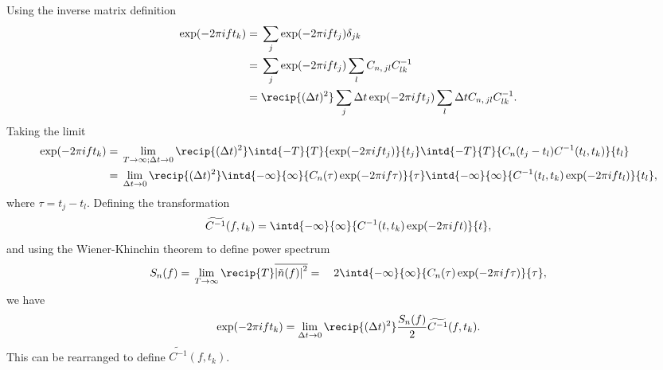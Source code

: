 Using the inverse matrix definition
\begin{align}
\exp(-2\pi i f t_k) = {} & \sum_j \exp(-2\pi ift_j) \delta_{jk} \nonumber \\
 = {} & \sum_j \exp(-2\pi ift_j) \sum_l C_{n,\,jl}C^{-1}_{lk} \nonumber \\
 = {} & \recip{(\Delta t)^2} \sum_j \Delta t \exp(-2\pi ift_j) \sum_l \Delta t C_{n,\,jl}C^{-1}_{lk}.
\end{align}
Taking the limit
\begin{align}
\exp(-2\pi i f t_k) = {} & \lim_{T \rightarrow \infty; \Delta t \rightarrow 0} \recip{(\Delta t)^2} \intd{-T}{T}{\exp(-2\pi ift_j)}{t_j} \intd{-T}{T}{C_n(t_j-t_l)C^{-1}(t_l,t_k)}{t_l} \nonumber \\
 = {} & \lim_{\Delta t \rightarrow 0} \recip{(\Delta t)^2} \intd{-\infty}{\infty}{C_n(\tau)\exp(-2\pi if\tau)}{\tau} \intd{-\infty}{\infty}{C^{-1}(t_l,t_k)\exp(-2\pi if t_l)}{t_l},
\end{align}
where $\tau = t_j - t_l$. Defining the transformation
\begin{equation}
\widetilde{C^{-1}}(f,t_k) = \intd{-\infty}{\infty}{C^{-1}(t,t_k)\exp(-2\pi if t)}{t},
\end{equation}
and using the Wiener-Khinchin theorem to define power spectrum
\begin{align}
S_n(f) = {} & \lim_{T \rightarrow \infty} \recip{T} \overline{\left|\tilde{n}(f)\right|^2}
 = {} & 2 \intd{-\infty}{\infty}{C_n(\tau)\exp(-2\pi i f\tau)}{\tau},
\end{align}
we have
\begin{equation}
\exp(-2\pi i f t_k) = \lim_{\Delta t \rightarrow 0} \recip{(\Delta t)^2} \frac{S_n(f)}{2} \widetilde{C^{-1}}(f,t_k).
\end{equation}
This can be rearranged to define $\widetilde{C^{-1}}(f,t_k)$.

